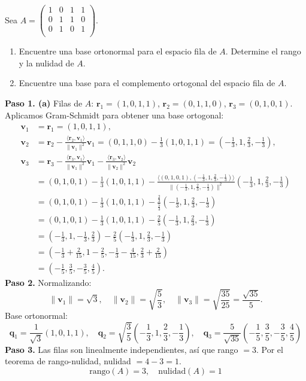 \begin{prob}
Sea $A=\left( \begin{array}{cccc} 
	1&0&1&1\\
	0&1&1&0\\
	0&1&0&1\\
	\end{array} \right).$ 
	\begin{enumerate}
	\item Encuentre una base ortonormal para el espacio fila de $A.$ Determine el rango y la nulidad de $A.$
	\item Encuentre una base para el complemento ortogonal del espacio fila de $A.$
	\end{enumerate}
\begin{myproof}
\textbf{Paso 1. (a)} Filas de \( A \): \( \mathbf{r}_1 = (1,0,1,1) \), \( \mathbf{r}_2 = (0,1,1,0) \), \( \mathbf{r}_3 = (0,1,0,1) \).
Aplicamos Gram-Schmidt para obtener una base ortogonal:
\begin{align*}
\mathbf{v}_1 &= \mathbf{r}_1 = (1,0,1,1), \\
\mathbf{v}_2 &= \mathbf{r}_2 - \frac{\langle \mathbf{r}_2, \mathbf{v}_1 \rangle}{\|\mathbf{v}_1\|^2} \mathbf{v}_1
= (0,1,1,0) - \frac{1}{3}(1,0,1,1) = \left(-\frac{1}{3},1,\frac{2}{3},-\frac{1}{3}\right), \\
\mathbf{v}_3 &= \mathbf{r}_3 - \frac{\langle \mathbf{r}_3, \mathbf{v}_1 \rangle}{\|\mathbf{v}_1\|^2} \mathbf{v}_1 - \frac{\langle \mathbf{r}_3, \mathbf{v}_2 \rangle}{\|\mathbf{v}_2\|^2} \mathbf{v}_2 \\
&= (0,1,0,1) - \frac{1}{3}(1,0,1,1) - \frac{\langle (0,1,0,1), (-\frac{1}{3},1,\frac{2}{3},-\frac{1}{3}) \rangle}{\|(-\frac{1}{3},1,\frac{2}{3},-\frac{1}{3})\|^2} \left(-\frac{1}{3},1,\frac{2}{3},-\frac{1}{3}\right) \\
&= (0,1,0,1) - \frac{1}{3}(1,0,1,1) - \frac{\frac{2}{3}}{\frac{5}{3}} \left(-\frac{1}{3},1,\frac{2}{3},-\frac{1}{3}\right) \\
&= (0,1,0,1) - \frac{1}{3}(1,0,1,1) - \frac{2}{5} \left(-\frac{1}{3},1,\frac{2}{3},-\frac{1}{3}\right) \\
&= \left(-\frac{1}{3}, 1, -\frac{1}{3}, \frac{2}{3}\right) - \frac{2}{5}\left(-\frac{1}{3},1,\frac{2}{3},-\frac{1}{3}\right) \\
&= \left(-\frac{1}{3}+\frac{2}{15}, 1-\frac{2}{5}, -\frac{1}{3}-\frac{4}{15}, \frac{2}{3}+\frac{2}{15}\right) \\
&= \left(-\frac{1}{5}, \frac{3}{5}, -\frac{3}{5}, \frac{4}{5}\right).
\end{align*}
\textbf{Paso 2.} Normalizando:
\[
\|\mathbf{v}_1\| = \sqrt{3},\quad \|\mathbf{v}_2\| = \sqrt{\frac{5}{3}},\quad \|\mathbf{v}_3\| = \sqrt{\frac{35}{25}} = \frac{\sqrt{35}}{5}.
\]
Base ortonormal:
\[
\boxed{
\mathbf{q}_1 = \frac{1}{\sqrt{3}}(1,0,1,1),\quad
\mathbf{q}_2 = \sqrt{\frac{3}{5}}\left(-\frac{1}{3},1,\frac{2}{3},-\frac{1}{3}\right),\quad
\mathbf{q}_3 = \frac{5}{\sqrt{35}}\left(-\frac{1}{5},\frac{3}{5},-\frac{3}{5},\frac{4}{5}\right)
}
\]
\textbf{Paso 3.} Las filas son linealmente independientes, así que rango \( = 3 \). Por el teorema de rango-nulidad, nulidad \( = 4-3 = 1 \).
\[
\boxed{\text{rango}(A) = 3, \quad \text{nulidad}(A) = 1}
\]


\end{myproof}
\end{prob}
